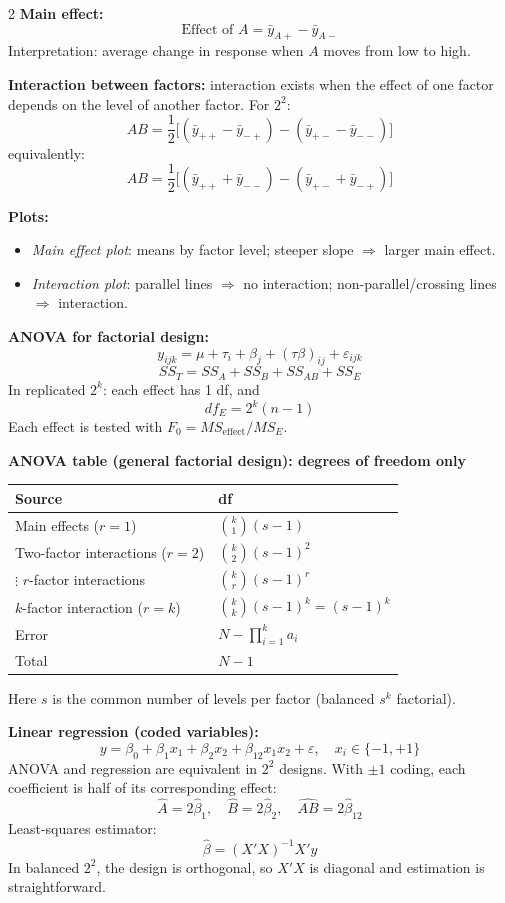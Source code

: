 \documentclass[10pt, letterpaper]{article}
\begin{document}
\begin{multicols}{2}
\textbf{Main effect:}
\[
\text{Effect of }A=\bar y_{A+}-\bar y_{A-}
\]
Interpretation: average change in response when $A$ moves from low to high.

\textbf{Interaction between factors:}
interaction exists when the effect of one factor depends on the level of another factor.
For $2^2$:
\[
AB=\frac{1}{2}\Big[(\bar y_{++}-\bar y_{-+})-(\bar y_{+-}-\bar y_{--})\Big]
\]
equivalently:
\[
AB=\frac{1}{2}\Big[(\bar y_{++}+\bar y_{--})-(\bar y_{+-}+\bar y_{-+})\Big]
\]

\textbf{Plots:}
\begin{itemize}
  \item \textit{Main effect plot}: means by factor level; steeper slope $\Rightarrow$ larger main effect.
  \item \textit{Interaction plot}: parallel lines $\Rightarrow$ no interaction; non-parallel/crossing lines $\Rightarrow$ interaction.
\end{itemize}

\textbf{ANOVA for factorial design:}
\[
y_{ijk}=\mu+\tau_i+\beta_j+(\tau\beta)_{ij}+\varepsilon_{ijk}
\]
\[
SS_T=SS_A+SS_B+SS_{AB}+SS_E
\]
In replicated $2^k$: each effect has 1 df, and
\[
df_E=2^k(n-1)
\]
Each effect is tested with $F_0=MS_{\text{effect}}/MS_E$.

\textbf{ANOVA table (general factorial design): degrees of freedom only}
\begin{center}
\footnotesize
\begin{tabular}{ll}
\toprule
Source & df \\
\midrule
Main effects ($r=1$) & $\binom{k}{1}(s-1)$ \\
Two-factor interactions ($r=2$) & $\binom{k}{2}(s-1)^2$ \\
$\vdots$ $r$-factor interactions & $\binom{k}{r}(s-1)^r$ \\
$k$-factor interaction ($r=k$) & $\binom{k}{k}(s-1)^k=(s-1)^k$ \\
Error & $N-\prod_{i=1}^{k}a_i$ \\
Total & $N-1$ \\
\bottomrule
\end{tabular}
\end{center}
Here $s$ is the common number of levels per factor (balanced $s^k$ factorial).

\textbf{Linear regression (coded variables):}
\[
y=\beta_0+\beta_1x_1+\beta_2x_2+\beta_{12}x_1x_2+\varepsilon,\quad x_i\in\{-1,+1\}
\]
ANOVA and regression are equivalent in $2^2$ designs.
With $\pm1$ coding, each coefficient is half of its corresponding effect:
\[
\hat A=2\hat\beta_1,\quad \hat B=2\hat\beta_2,\quad \widehat{AB}=2\hat\beta_{12}
\]
Least-squares estimator:
\[
\hat{\beta}=(X'X)^{-1}X'y
\]
In balanced $2^2$, the design is orthogonal, so $X'X$ is diagonal and estimation is straightforward.


\end{multicols}
\end{document}
